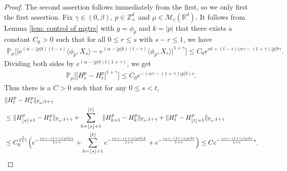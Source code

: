 \documentclass[12pt,a4paper]{amsart}
\theoremstyle{plain}
\theoremstyle{definition}
\numberwithin{equation}{section}
\begin{document}
\begin{proof}
The second assertion follows immediately from the first, so we only first the first assertion.
     Fix $\gamma \in (0,\beta)$, $p\in \mathbb{Z}_+^d$ and $\mu\in \mathcal M_c(\mathbb R^d)$.
It follows from Lemma \ref{lem: control of mgtrs} with $g=\phi_p$ and $k=|p|$ that
 there exists a constant $C_0>0$ such that for all $0\leq r\leq s $ with $s-r\leq1$, we have
    \begin{align}
        \mathbb{P}_{\mu}\big[\big|e^{(\alpha-|p|b)(t-s)}\langle\phi_p, X_s\rangle-e^{(\alpha-|p|b)(t-r)}\langle\phi_p, X_r\rangle\big|^{1+\gamma}\big]
        \leq C_0e^{\alpha t+(t-s)(\alpha\gamma-(1+\gamma)|p|b\gamma}.
    \end{align}
    Dividing both sides by $e^{(\alpha-|p|b) t(1+\gamma)}$, we get
    \begin{align}
        \mathbb{P}_{\mu}\big[|H^p_s-H^p_r|^{1+\gamma}\big]\leq  C_0 e^{-(\alpha\gamma-(1+\gamma)|p|b)s}.
    \end{align}
    Thus there is a $C>0$ such that for any $0\leq s<t$,
\begin{align}
	& \|H^p_t-H^p_s\|_{\mathbb{P}_{\mu};1+\gamma}
	\\&\leq \|H^p_{\lfloor s \rfloor+1}-H^p_s\|_{\mathbb{P}_{\mu};1+\gamma}+\sum_{k=\lfloor s \rfloor+1}^{\lfloor t \rfloor}\|H^p_{k+1}-H^p_{k}\|_{\mathbb{P}_{\mu};1+\gamma}+\|H^p_t-H^p_{\lfloor t \rfloor+1}\|_{\mathbb{P}_{\mu};1+\gamma}
	\\& \leq C_0^{\frac{1}{1+\gamma}} \Big(e^{-\frac{(\alpha \gamma-(1+\gamma)|p|b) s}{1+\gamma}}+\sum_{k=\lfloor s \rfloor+1}^{\lfloor t \rfloor}e^{-\frac{(\alpha \gamma-(1+\gamma)|p|b) k}{1+\gamma}}+ e^{-\frac{(\alpha \gamma-(1+\gamma)|p|b t}{1+\gamma}}\Big)
	\leq Ce^{-\frac{(\alpha \gamma-(1+\gamma)|p|b)}{1+\gamma}s}.
    \qedhere
\end{align}	
\end{proof}
\end{document}
